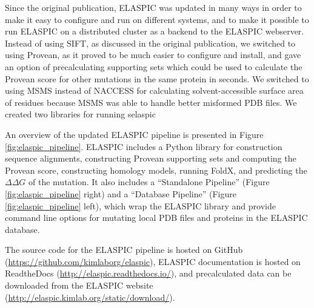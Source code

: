 Since the original publication, ELASPIC was updated in many ways in order to make it easy to configure and run on different systems, and to make it possible to run ELASPIC on a distributed cluster as a backend to the ELASPIC webserver. Instead of using SIFT, as discussed in the original publication, we switched to using Provean, as it proved to be much easier to configure and install, and gave an option of precalculating supporting sets which could be used to calculate the Provean score for other mutations in the same protein in seconds. We switched to using MSMS instead of NACCESS for calculating solvent-accessible surface area of residues because MSMS was able to handle better misformed PDB files. We created two libraries for running selaspic

An overview of the updated ELASPIC pipeline is presented in Figure \ref{fig:elaspic_pipeline}. ELASPIC includes a Python library for construction sequence alignments, constructing Provean supporting sets and computing the Provean score, constructing homology models, running FoldX, and predicting the $\Delta \Delta G$ of the mutation. It also includes a ``Standalone Pipeline'' (Figure \ref{fig:elaspic_pipeline} right) and a ``Database Pipeline'' (Figure \ref{fig:elaspic_pipeline} left), which wrap the ELASPIC library and provide command line options for mutating local PDB files and proteins in the ELASPIC database.

The source code for the ELASPIC pipeline is hosted on GitHub (\url{https://github.com/kimlaborg/elaspic}), ELASPIC documentation is hosted on ReadtheDocs (\url{http://elaspic.readthedocs.io/}), and precalculated data can be downloaded from the ELASPIC website (\url{http://elaspic.kimlab.org/static/download/}).


